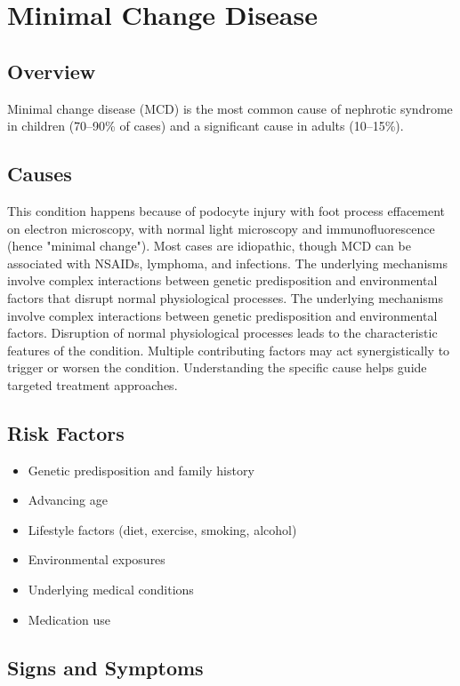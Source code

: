 \chapter{Minimal Change Disease}
\label{sec:Minimal Change Disease}

\section{Overview}
Minimal change disease (MCD) is the most common cause of nephrotic syndrome in children (70--90\% of cases) and a significant cause in adults (10--15\%).
\section{Causes}
This condition happens because of podocyte injury with foot process effacement on electron microscopy, with normal light microscopy and immunofluorescence (hence "minimal change"). Most cases are idiopathic, though MCD can be associated with NSAIDs, lymphoma, and infections. The underlying mechanisms involve complex interactions between genetic predisposition and environmental factors that disrupt normal physiological processes. The underlying mechanisms involve complex interactions between genetic predisposition and environmental factors. Disruption of normal physiological processes leads to the characteristic features of the condition. Multiple contributing factors may act synergistically to trigger or worsen the condition. Understanding the specific cause helps guide targeted treatment approaches.
\section{Risk Factors}


\begin{itemize}[noitemsep]
  \item Genetic predisposition and family history
  \item Advancing age
  \item Lifestyle factors (diet, exercise, smoking, alcohol)
  \item Environmental exposures
  \item Underlying medical conditions
  \item Medication use
\end{itemize}
\section{Signs and Symptoms}

